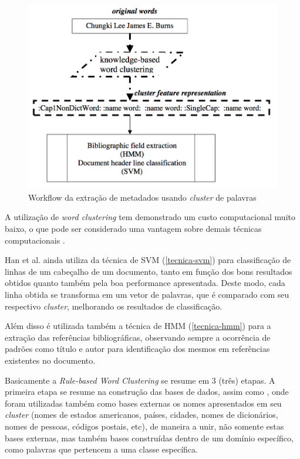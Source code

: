 \begin{figure}
\centering
\caption{Workflow da extração de metadados usando \textit{cluster} de palavras}
\label{fig:workflow-rule-based}
\includegraphics[width=0.7\linewidth]{./assets/workflow-rule-based}
\end{figure}

\begin{textonovo}
A utilização de \textit{word clustering} tem demonstrado um custo computacional muito baixo, o que pode ser considerado uma vantagem sobre demais técnicas computacionais \cite{Han-Giles-WC}.
\end{textonovo}

\begin{textoalterado}

Han et al. ainda utiliza da técnica  de SVM (\autoref{tecnica-svm}) para classificação de linhas de um cabeçalho de um documento, tanto em função dos bons resultados obtidos quanto também pela boa performance apresentada. Deste modo, cada linha obtida se transforma em um vetor de palavras, que é comparado com seu respectivo \textit{cluster}, melhorando os resultados de classificação.

\end{textoalterado}

Além disso é utilizada também a técnica de HMM (\autoref{tecnica-hmm}) para a extração das referências bibliográficas, observando sempre a ocorrência de padrões como título e autor para identificação dos mesmos em referências existentes no documento.

Basicamente a \textit{Rule-based Word Clustering} se resume em 3 (três) etapas. A primeira etapa se resume na construção das bases de dados, assim como \cite{Han-SVM}, onde foram utilizadas também como bases externas os nomes apresentados em seu \textit{cluster} (nomes de estados americanos, países, cidades, nomes de dicionários, nomes de pessoas, códigos postais, etc), de maneira a unir, não somente estas bases externas, mas também bases construídas dentro de um domínio específico, como palavras que pertencem a uma classe específica.

